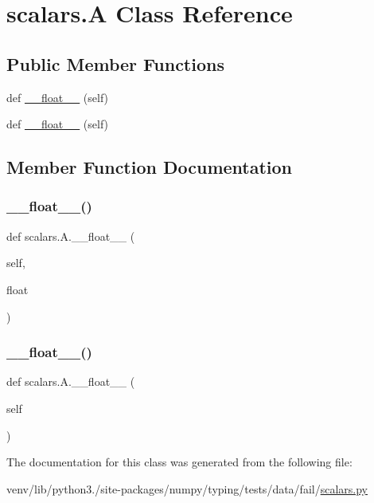 \hypertarget{classscalars_1_1A}{}\section{scalars.\+A Class Reference}
\label{classscalars_1_1A}
\subsection*{Public Member Functions}
\begin{DoxyCompactItemize}
\item 
def \hyperlink{classscalars_1_1A_a66747a11dea7ba94058ffbd07e5f0f9d}{\+\_\+\+\_\+float\+\_\+\+\_\+} (self)
\item 
def \hyperlink{classscalars_1_1A_a66747a11dea7ba94058ffbd07e5f0f9d}{\+\_\+\+\_\+float\+\_\+\+\_\+} (self)
\end{DoxyCompactItemize}


\subsection{Member Function Documentation}
\mbox{\label{classscalars_1_1A_a66747a11dea7ba94058ffbd07e5f0f9d}} 
\subsubsection{\texorpdfstring{\+\_\+\+\_\+float\+\_\+\+\_\+()}{\_\_float\_\_()}\hspace{0.1cm}{\footnotesize\ttfamily [1/2]}}
{\footnotesize\ttfamily def scalars.\+A.\+\_\+\+\_\+float\+\_\+\+\_\+ (\begin{DoxyParamCaption}\item[{}]{self,  }\item[{}]{float }\end{DoxyParamCaption})}

\mbox{\label{classscalars_1_1A_a66747a11dea7ba94058ffbd07e5f0f9d}} 
\subsubsection{\texorpdfstring{\+\_\+\+\_\+float\+\_\+\+\_\+()}{\_\_float\_\_()}\hspace{0.1cm}{\footnotesize\ttfamily [2/2]}}
{\footnotesize\ttfamily def scalars.\+A.\+\_\+\+\_\+float\+\_\+\+\_\+ (\begin{DoxyParamCaption}\item[{}]{self }\end{DoxyParamCaption})}



The documentation for this class was generated from the following file\+:\begin{DoxyCompactItemize}
\item 
venv/lib/python3./site-\/packages/numpy/typing/tests/data/fail/\hyperlink{fail_2scalars_8py}{scalars.\+py}\end{DoxyCompactItemize}
